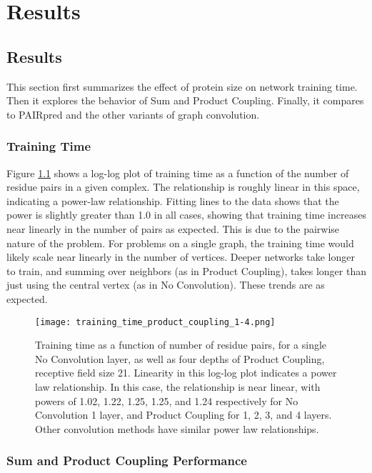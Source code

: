 \chapter{Results}
\label{chap:results}


\section{Results}

This section first summarizes the effect of protein size on network training time.
Then it explores the behavior of Sum and Product Coupling.
Finally, it compares to PAIRpred and the other variants of graph convolution.


\subsection{Training Time}

Figure \ref{fig:train_times} shows a log-log plot of training time as a function of the number of residue pairs in a given complex.
The relationship is roughly linear in this space, indicating a power-law relationship.
Fitting lines to the data shows that the power is slightly greater than 1.0 in all cases, showing that training time increases near linearly in the number of pairs as expected.
This is due to the pairwise nature of the problem.
For problems on a single graph, the training time would likely scale near linearly in the number of vertices.
Deeper networks take longer to train, and summing over neighbors (as in Product Coupling), takes longer than just using the central vertex (as in No Convolution).
These trends are as expected. 


\begin{figure}
	\texttt{[image: training\_time\_product\_coupling\_1-4.png]}
	\caption{Training time as a function of number of residue pairs, for a single No Convolution layer, as well as four depths of Product Coupling, receptive field size 21. Linearity in this log-log plot indicates a power law relationship. In this case, the relationship is near linear, with powers of 1.02, 1.22, 1.25, 1.25, and 1.24 respectively for No Convolution 1 layer, and Product Coupling for 1, 2, 3, and 4 layers. Other convolution methods have similar power law relationships. 
		\label{fig:train_times}}
\end{figure}




\subsection{Sum and Product Coupling Performance}

